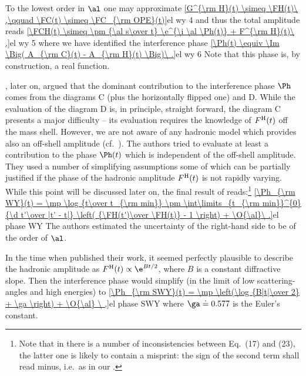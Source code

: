 To the lowest order in $\al$ one may approximate
\eqref{G^{\rm H}(t) \simeq \FH(t)\ ,\qquad \FC(t) \simeq \FC_{\rm OPE}(t)}{el wy 4}
and thus the total amplitude reads
\eqref{\FCH(t) \simeq \pm {\al s\over t} \e^{\i \al \Ph(t)} + F^{\rm H}(t)\ ,}{el wy 5}
where we have identified the interference phase
\eqref{\Ph(t) \equiv \Im \Big( A_{\rm C}(t) - A_{\rm H}(t) \Big)\ .}{el wy 6}
Note that this phase is, by construction, a real function.


\WY, later on, argued that the dominant contribution to the interference phase $\Ph$ comes from the diagrams  C (plus the horizontally flipped one) and D. While the evaluation of the diagram D is, in principle, straight forward, the diagram C presents a major difficulty -- its evaluation requires the knowledge of $F^{\rm H}(t)$ off the mass shell. However, we are not aware of any hadronic model which provides also an off-shell amplitude (cf.~). The authors tried to evaluate at least a contribution to the phase $\Ph(t)$ which is independent of the off-shell amplitude. They used a number of simplifying assumptions some of which can be partially justified if the phase of the hadronic amplitude $F^{\rm H}(t)$ is not rapidly varying. While this point will be discussed later on, the final result of \WY{} reads:\footnote{%
Note that in  there is a number of inconsistencies between Eq.~(17) and (23), the latter one is likely to contain a misprint: the sign of the second term shall read minus, i.e.~as in our .
}
\eqref{\Ph_{\rm WY}(t) = \mp \log {t\over t_{\rm min}} \pm \int\limits_{t_{\rm min}}^{0} {\d t'\over |t' - t|} \left( {\FH(t')\over \FH(t)} - 1 \right) + \O{\al}\ .}{el phase WY}
The authors estimated the uncertainty of the right-hand side to be of the order of $\al$.

In the time when \WY{} published their work, it seemed perfectly plausible to describe the hadronic amplitude as $\FH(t) \propto \e^{Bt/2}$, where $B$ is a constant diffractive slope. Then the interference phase would simplify (in the limit of low scattering-angles and high energies) to
\eqref{\Ph_{\rm SWY}(t) = \mp \left(\log {B|t|\over 2} + \ga \right) + \O{\al} \ ,}{el phase SWY}
where $\ga \doteq 0.577$ is the Euler's constant.

